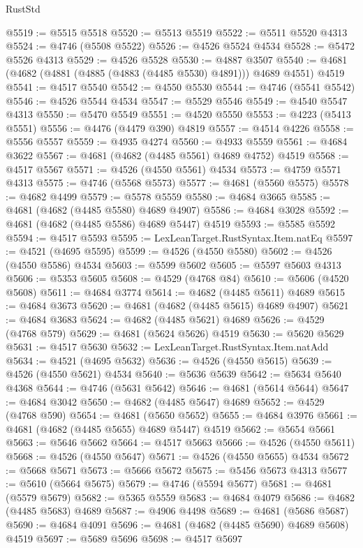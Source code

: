 \begin{lexlean}{RustStd}
\begin{coremodule}
@5519 := @5515 @5518
@5520 := @5513 @5519
@5522 := @5511 @5520 @4313
@5524 := @4746 (@5508 @5522)
@5526 := @4526 @5524 @4534
@5528 := @5472 @5526 @4313
@5529 := @4526 @5528
@5530 := @4887 @3507
@5540 := @4681 (@4682 (@4881 (@4885 (@4883 (@4485 @5530) @4891))) @4689 @4551) @4519
@5541 := @4517 @5540
@5542 := @4550 @5530
@5544 := @4746 (@5541 @5542)
@5546 := @4526 @5544 @4534
@5547 := @5529 @5546
@5549 := @4540 @5547 @4313
@5550 := @5470 @5549
@5551 := @4520 @5550
@5553 := @4223 (@5413 @5551)
@5556 := @4476 (@4479 @390) @4819
@5557 := @4514 @4226
@5558 := @5556 @5557
@5559 := @4935 @4274
@5560 := @4933 @5559
@5561 := @4684 @3622
@5567 := @4681 (@4682 (@4485 @5561) @4689 @4752) @4519
@5568 := @4517 @5567
@5571 := @4526 (@4550 @5561) @4534
@5573 := @4759 @5571 @4313
@5575 := @4746 (@5568 @5573)
@5577 := @4681 (@5560 @5575)
@5578 := @4682 @4499
@5579 := @5578 @5559
@5580 := @4684 @3665
@5585 := @4681 (@4682 (@4485 @5580) @4689 @4907)
@5586 := @4684 @3028
@5592 := @4681 (@4682 (@4485 @5586) @4689 @5447) @4519
@5593 := @5585 @5592
@5594 := @4517 @5593
@5595 := LexLeanTarget.RustSyntax.Item.natEq
@5597 := @4521 (@4695 @5595)
@5599 := @4526 (@4550 @5580)
@5602 := @4526 (@4550 @5586) @4534
@5603 := @5599 @5602
@5605 := @5597 @5603 @4313
@5606 := @5353 @5605
@5608 := @4529 (@4768 @84)
@5610 := @5606 (@4520 @5608)
@5611 := @4684 @3774
@5614 := @4682 (@4485 @5611) @4689
@5615 := @4684 @3673
@5620 := @4681 (@4682 (@4485 @5615) @4689 @4907)
@5621 := @4684 @3683
@5624 := @4682 (@4485 @5621) @4689
@5626 := @4529 (@4768 @579)
@5629 := @4681 (@5624 @5626) @4519
@5630 := @5620 @5629
@5631 := @4517 @5630
@5632 := LexLeanTarget.RustSyntax.Item.natAdd
@5634 := @4521 (@4695 @5632)
@5636 := @4526 (@4550 @5615)
@5639 := @4526 (@4550 @5621) @4534
@5640 := @5636 @5639
@5642 := @5634 @5640 @4368
@5644 := @4746 (@5631 @5642)
@5646 := @4681 (@5614 @5644)
@5647 := @4684 @3042
@5650 := @4682 (@4485 @5647) @4689
@5652 := @4529 (@4768 @590)
@5654 := @4681 (@5650 @5652)
@5655 := @4684 @3976
@5661 := @4681 (@4682 (@4485 @5655) @4689 @5447) @4519
@5662 := @5654 @5661
@5663 := @5646 @5662
@5664 := @4517 @5663
@5666 := @4526 (@4550 @5611)
@5668 := @4526 (@4550 @5647)
@5671 := @4526 (@4550 @5655) @4534
@5672 := @5668 @5671
@5673 := @5666 @5672
@5675 := @5456 @5673 @4313
@5677 := @5610 (@5664 @5675)
@5679 := @4746 (@5594 @5677)
@5681 := @4681 (@5579 @5679)
@5682 := @5365 @5559
@5683 := @4684 @4079
@5686 := @4682 (@4485 @5683) @4689
@5687 := @4906 @4498
@5689 := @4681 (@5686 @5687)
@5690 := @4684 @4091
@5696 := @4681 (@4682 (@4485 @5690) @4689 @5608) @4519
@5697 := @5689 @5696
@5698 := @4517 @5697

\end{coremodule}
\end{lexlean}
